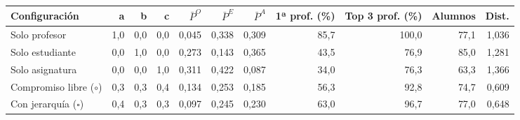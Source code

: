 \begin{tabular}{lrrrrrrrrrr}
\toprule
\textbf{Configuración} & \textbf{a} & \textbf{b} & \textbf{c} & \textbf{$\bar P^O$} & \textbf{$\bar P^E$} & \textbf{$\bar P^A$} & \textbf{1ª prof. (\%)} & \textbf{Top 3 prof. (\%)} & \textbf{Alumnos} & \textbf{Dist.} \\
\midrule
Solo profesor & 1,0 & 0,0 & 0,0 & 0,045 & 0,338 & 0,309 & 85,7 & 100,0 & 77,1 & 1,036 \\
Solo estudiante & 0,0 & 1,0 & 0,0 & 0,273 & 0,143 & 0,365 & 43,5 & 76,9 & 85,0 & 1,281 \\
Solo asignatura & 0,0 & 0,0 & 1,0 & 0,311 & 0,422 & 0,087 & 34,0 & 76,3 & 63,3 & 1,366 \\
Compromiso libre ($\circ$) & 0,3 & 0,3 & 0,4 & 0,134 & 0,253 & 0,185 & 56,3 & 92,8 & 74,7 & 0,609 \\
Con jerarquía ($\square$) & 0,4 & 0,3 & 0,3 & 0,097 & 0,245 & 0,230 & 63,0 & 96,7 & 77,0 & 0,648 \\
\bottomrule
\end{tabular}
